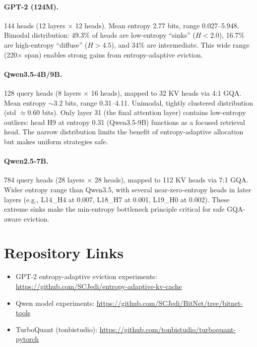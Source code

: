 \documentclass[11pt]{article}
\begin{document}
\paragraph{GPT-2 (124M).}  144 heads (12 layers $\times$ 12 heads).  Mean entropy 2.77 bits, range 0.027--5.948.  Bimodal distribution: 49.3\% of heads are low-entropy ``sinks'' ($H < 2.0$), 16.7\% are high-entropy ``diffuse'' ($H > 4.5$), and 34\% are intermediate.  This wide range (220$\times$ span) enables strong gains from entropy-adaptive eviction.

\paragraph{Qwen3.5-4B/9B.}  128 query heads (8 layers $\times$ 16 heads), mapped to 32 KV heads via 4:1 GQA.  Mean entropy $\sim$3.2 bits, range 0.31--4.11.  Unimodal, tightly clustered distribution (std $\approx 0.60$ bits).  Only layer 31 (the final attention layer) contains low-entropy outliers: head H9 at entropy 0.31 (Qwen3.5-9B) functions as a focused retrieval head.  The narrow distribution limits the benefit of entropy-adaptive allocation but makes uniform strategies safe.

\paragraph{Qwen2.5-7B.}  784 query heads (28 layers $\times$ 28 heads), mapped to 112 KV heads via 7:1 GQA.  Wider entropy range than Qwen3.5, with several near-zero-entropy heads in later layers (e.g., L14\_H4 at 0.007, L18\_H7 at 0.001, L19\_H0 at 0.002).  These extreme sinks make the min-entropy bottleneck principle critical for safe GQA-aware eviction.

\section{Repository Links}
\label{app:code}

\begin{itemize}[leftmargin=*]
    \item GPT-2 entropy-adaptive eviction experiments: \url{https://github.com/SCJedi/entropy-adaptive-kv-cache}
    \item Qwen model experiments: \url{https://github.com/SCJedi/BitNet/tree/bitnet-tools}
    \item TurboQuant (tonbistudio): \url{https://github.com/tonbistudio/turboquant-pytorch}
\end{itemize}
\end{document}
